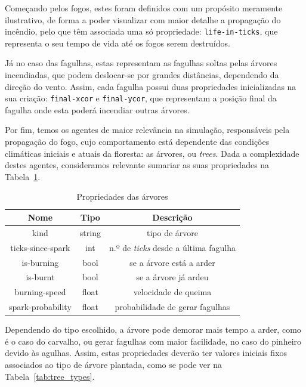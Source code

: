 Começando pelos fogos, estes foram definidos com um propósito meramente ilustrativo, de forma a poder visualizar com maior detalhe a propagação do incêndio, pelo que têm associada uma só propriedade: \texttt{life-in-ticks}, que representa o seu tempo de vida até os fogos serem destruídos.

Já no caso das fagulhas, estas representam as fagulhas soltas pelas árvores incendiadas, que podem deslocar-se por grandes distâncias, dependendo da direção do vento.
Assim, cada fagulha possui duas propriedades inicializadas na sua criação: \texttt{final-xcor} e \texttt{final-ycor}, que representam a posição final da fagulha onde esta poderá incendiar outras árvores.

Por fim, temos os agentes de maior relevância na simulação, responsáveis pela propagação do fogo, cujo comportamento está dependente das condições climáticas iniciais e atuais da floresta: as árvores, ou \textit{trees}.
Dada a complexidade destes agentes, consideramos relevante sumariar as suas propriedades na Tabela~\ref{tab:tree_props}.

\begin{table}[tbhp]
    \centering
    \begin{tabular}{ccc}
        \hline
        \textbf{Nome}     & \textbf{Tipo} & \textbf{Descrição}                           \\ \hline
        kind              & string        & tipo de árvore                               \\
        ticks-since-spark & int           & n.º de \textit{ticks} desde a última fagulha \\
        is-burning        & bool          & se a árvore está a arder                     \\
        is-burnt          & bool          & se a árvore já ardeu                         \\
        burning-speed     & float         & velocidade de queima                         \\
        spark-probability & float         & probabilidade de gerar fagulhas              \\ \hline
    \end{tabular}
    \caption{Propriedades das árvores}
    \label{tab:tree_props}
\end{table}

Dependendo do tipo escolhido, a árvore pode demorar mais tempo a arder, como é o caso do carvalho, ou gerar fagulhas com maior facilidade, no caso do pinheiro devido às agulhas.
Assim, estas propriedades deverão ter valores iniciais fixos associados ao tipo de árvore plantada, como se pode ver na Tabela~\ref{tab:tree_types}.

